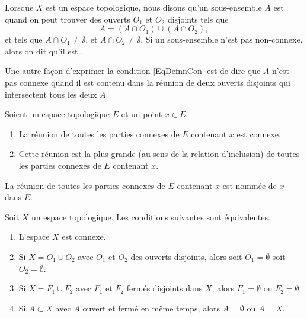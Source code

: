 \begin{definition}  \label{DefIRKNooJJlmiD}
     Lorsque $X$ est un espace topologique, nous disons qu'un sous-ensemble $A$ est  quand on peut trouver des ouverts $O_1$ et $O_2$ disjoints tels que
    \begin{equation}    \label{EqDefnnCon}
        A=(A\cap O_1)\cup (A\cap O_2),
    \end{equation}
    et tels que $A\cap O_1\neq\emptyset$, et $A\cap O_2\neq\emptyset$. Si un sous-ensemble n'est pas non-connexe, alors on dit qu'il est .
\end{definition}
Une autre façon d'exprimer la condition \eqref{EqDefnnCon} est de dire que $A$ n'est pas connexe quand il est contenu dans la réunion de deux ouverts disjoints qui intersectent tous les deux $A$.


\begin{propositionDef}        \label{DEFooFHXNooJGUPPn}
    Soient un espace topologique \( E\) et un point \( x\in E\).
    \begin{enumerate}
        \item
            La réunion de toutes les parties connexes de \( E\) contenant $x$ est connexe. 
        \item
            Cette réunion est la plus grande (au sens de la relation d'inclusion) de toutes les parties connexes de \( E\) contenant $x$.
    \end{enumerate}
    La réunion de toutes les parties connexes de \( E\) contenant $x$ est nommée  de \( x\) dans \( E\).
\end{propositionDef}

\begin{proposition} \label{PropHSjJcIr}
    Soit \( X\) un espace topologique. Les conditions suivantes sont équivalentes.
    \begin{enumerate}
        \item       \label{ITEMooXHIKooGqrgTs}
            L'espace \( X\) est connexe.
        \item       \label{ITEMooRTNPooADKVnw}
            Si \( X=O_1\cup O_2\) avec \( O_1\) et \( O_2\) des ouverts disjoints, alors soit \( O_1=\emptyset\) soit \( O_2=\emptyset\).
        \item       \label{ITEMooOEZYooFBNaOZ}
            Si \( X=F_1\cup F_2\) avec \( F_1\) et \( F_2\) fermés disjoints dans \( X\), alors \( F_1=\emptyset\) ou \( F_2=\emptyset\).
        \item       \label{ITEMooNIPZooIDPmEf}
            Si \( A\subset X\) avec \( A\) ouvert et fermé en même temps, alors \( A=\emptyset\) ou \( A=X\).
    \end{enumerate}
\end{proposition}

